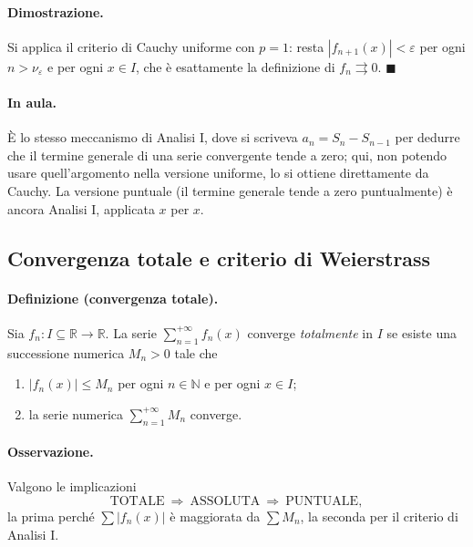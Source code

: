 \paragraph{Dimostrazione.} Si applica il criterio di Cauchy uniforme con $p=1$: resta
$|f_{n+1}(x)|<\varepsilon$ per ogni $n>\nu_\varepsilon$ e per ogni $x\in I$, che è
esattamente la definizione di $f_n\rightrightarrows0$. $\blacksquare$

\paragraph{In aula.} È lo stesso meccanismo di Analisi I, dove si scriveva
$a_n=S_n-S_{n-1}$ per dedurre che il termine generale di una serie convergente tende a
zero; qui, non potendo usare quell'argomento nella versione uniforme, lo si ottiene
direttamente da Cauchy. La versione puntuale (il termine generale tende a zero
puntualmente) è ancora Analisi I, applicata $x$ per $x$.

\subsection{Convergenza totale e criterio di Weierstrass}

\paragraph{Definizione (convergenza totale).} Sia
$f_n:I\subseteq\mathbb{R}\to\mathbb{R}$. La serie $\sum_{n=1}^{+\infty}f_n(x)$ converge
\emph{totalmente} in $I$ se esiste una successione numerica $M_n>0$ tale che
\begin{enumerate}
  \item $|f_n(x)|\le M_n$ per ogni $n\in\mathbb{N}$ e per ogni $x\in I$;
  \item la serie numerica $\sum_{n=1}^{+\infty}M_n$ converge.
\end{enumerate}

\paragraph{Osservazione.} Valgono le implicazioni
\begin{equation}
\text{TOTALE}\ \Longrightarrow\ \text{ASSOLUTA}\ \Longrightarrow\ \text{PUNTUALE},
\end{equation}
la prima perché $\sum|f_n(x)|$ è maggiorata da $\sum M_n$, la seconda per il criterio di
Analisi I.

